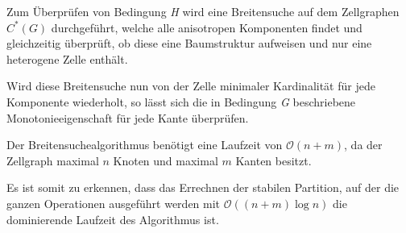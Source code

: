 Zum Überprüfen von Bedingung \emph{H} wird eine Breitensuche auf dem Zellgraphen $C^*(G)$ durchgeführt, welche alle anisotropen Komponenten findet und gleichzeitig überprüft, ob diese eine Baumstruktur aufweisen und nur eine heterogene Zelle enthält.

Wird diese Breitensuche nun von der Zelle minimaler Kardinalität für jede Komponente wiederholt, so lässt sich die in Bedingung \emph{G} beschriebene Monotonieeigenschaft für jede Kante überprüfen.

Der Breitensuchealgorithmus benötigt eine Laufzeit von $\mathcal{O}(n+m)$, da der Zellgraph maximal $n$ Knoten und maximal $m$ Kanten besitzt.

Es ist somit zu erkennen, dass das Errechnen der stabilen Partition, auf der die ganzen Operationen ausgeführt werden mit $\mathcal{O}((n+m)\log n)$ die dominierende Laufzeit des Algorithmus ist.